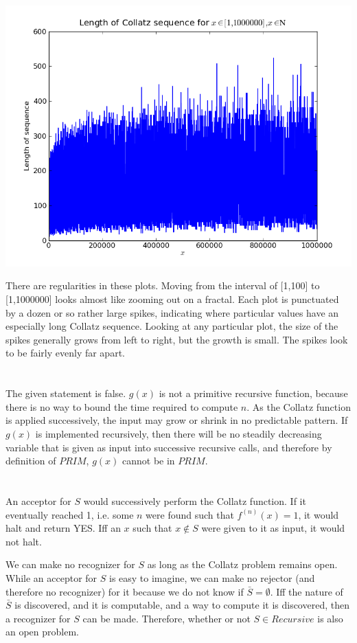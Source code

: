 \documentclass{article}
\begin{document}
\includegraphics[scale=0.5]{col1000000.png}

There are regularities in these plots. Moving from the interval of [1,100] to
[1,1000000] looks  almost like zooming out on a fractal. Each plot is punctuated
by a dozen or so rather large spikes, indicating where particular values have
an especially
long Collatz sequence. Looking at any particular plot, the size of the spikes
generally grows from left to right, but the growth is small. The
spikes look to be fairly evenly far apart.

\section{}
The given statement is false. $g(x)$ is not a primitive recursive function,
because there is no way to bound the time required to compute $n$. As the
Collatz function is applied successively, the input may grow or shrink in no
predictable pattern. If $g(x)$ is implemented recursively, then there
will be no steadily decreasing variable that is given as input into successive
recursive calls, and therefore by definition of $PRIM$, $g(x)$ cannot be in
$PRIM$.

\section{}
An acceptor for $S$ would successively perform the Collatz function. If it
eventually
reached 1, i.e. some $n$ were found such that $f^{(n)}(x)=1$, it would halt and
return YES. Iff an $x$ such that $x \notin S$ were
given to it as input, it would not halt.

\vspace{1em}

We can make no recognizer for $S$ as long as the Collatz problem remains open.
While an acceptor for $S$ is easy to imagine, we can make no rejector
(and therefore no recognizer) for it because we do not know if
$\bar S = \emptyset$. Iff the nature of
$\bar S$ is discovered, and it is computable, and a way to compute it is
discovered, then a recognizer for $S$ can be made. Therefore, whether or not
$S \in Recursive$ is also an open problem.
\end{document}
